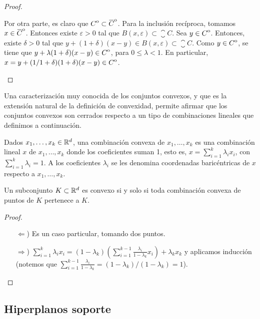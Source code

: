 \begin{proof}
\begin{enumerate}
        Por otra parte, es claro que $\interior{C} \subset \interior{\closure{C}}$. Para la inclusión recíproca, tomamos $x \in \interior{\closure{C}}$. Entonces existe $\varepsilon > 0$ tal que $B(x,\varepsilon) \subset \closure{C}$. Sea $y \in {\kern0ptC}^{\mathrm{o}}$. Entonces, existe $\delta > 0$ tal que $y + (1+\delta)(x-y) \in B(x,\varepsilon) \subset \closure{C}$. Como $y \in {\kern0ptC}^{\mathrm{o}}$, se tiene que $y + \lambda(1+\delta)(x-y) \in {\kern0ptC}^{\mathrm{o}}$, para $0 \le \lambda < 1$. En particular, $x = y + (1/1+\delta)(1+\delta)(x-y) \in {\kern0ptC}^{\mathrm{o}}$. 
    \end{enumerate}
\end{proof}

Una caracterización muy conocida de los conjuntos convexos, y que es la extensión natural de la definición de convexidad, permite afirmar que los conjuntos convexos son cerrados respecto a un tipo de combinaciones lineales que definimos a continuación.

\begin{definition}
    Dados $x_1,\dots,x_k \in \mathbb{R}^d$, una combinación convexa de $x_1,\dots,x_k$ es una combinación lineal $x$ de $x_1,\dots,x_k$ donde los coeficientes suman 1, esto es, $x = \sum_{i=1}^k \lambda_ix_i$, con $\sum_{i=1}^k \lambda_i = 1$. A los coeficientes $\lambda_i$ se les denomina coordenadas baricéntricas de $x$ respecto a $x_1,\dots,x_k$.
\end{definition}

\begin{prop}
    Un subconjunto $K \subset \mathbb{R}^d$ es convexo si y solo si toda combinación convexa de puntos de $K$ pertenece a $K$.
\end{prop}
\begin{proof}~
 \begin{enumerate}
     \item[$\Leftarrow$)] Es un caso particular, tomando dos puntos.

     \item[$\Rightarrow$)] $\sum_{i=1}^k \lambda_ix_i = (1-\lambda_k)\left( \sum_{i=1}^{k-1}\frac{\lambda_i}{1-\lambda_k}x_i \right) + \lambda_kx_k$ y aplicamos inducción (notemos que $\sum_{i=1}^{k-1}\frac{\lambda_i}{1-\lambda_k} = (1-\lambda_k)/(1-\lambda_k) = 1$).
\end{enumerate}
\end{proof}

\subsection{Hiperplanos soporte}

